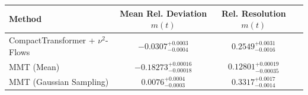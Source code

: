     \begin{tabular}{lccc}
        \toprule
        Method & Mean Rel. Deviation $m(t)$ & Rel. Resolution $m(t)$ \\
        \midrule
        CompactTransformer + $\nu^2$-Flows & $-0.0307^{+0.0003}_{-0.0004}$ & $0.2549^{+0.0031}_{-0.0016}$ \\
        MMT (Mean) & $-0.18273^{+0.00016}_{-0.00018}$ & $0.12801^{+0.00019}_{-0.00035}$ \\
        MMT (Gaussian Sampling) & $0.0076^{+0.0004}_{-0.0003}$ & $0.3317^{+0.0017}_{-0.0014}$ \\
        \bottomrule
    \end{tabular}